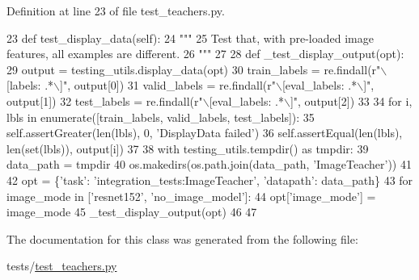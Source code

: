 Definition at line 23 of file test\+\_\+teachers.\+py.


\begin{DoxyCode}
23     \textcolor{keyword}{def }test\_display\_data(self):
24         \textcolor{stringliteral}{"""}
25 \textcolor{stringliteral}{        Test that, with pre-loaded image features, all examples are different.}
26 \textcolor{stringliteral}{        """}
27 
28         \textcolor{keyword}{def }\_test\_display\_output(opt):
29             output = testing\_utils.display\_data(opt)
30             train\_labels = re.findall(\textcolor{stringliteral}{r"\(\backslash\)[labels: .*\(\backslash\)]"}, output[0])
31             valid\_labels = re.findall(\textcolor{stringliteral}{r"\(\backslash\)[eval\_labels: .*\(\backslash\)]"}, output[1])
32             test\_labels = re.findall(\textcolor{stringliteral}{r"\(\backslash\)[eval\_labels: .*\(\backslash\)]"}, output[2])
33 
34             \textcolor{keywordflow}{for} i, lbls \textcolor{keywordflow}{in} enumerate([train\_labels, valid\_labels, test\_labels]):
35                 self.assertGreater(len(lbls), 0, \textcolor{stringliteral}{'DisplayData failed'})
36                 self.assertEqual(len(lbls), len(set(lbls)), output[i])
37 
38         with testing\_utils.tempdir() \textcolor{keyword}{as} tmpdir:
39             data\_path = tmpdir
40             os.makedirs(os.path.join(data\_path, \textcolor{stringliteral}{'ImageTeacher'}))
41 
42             opt = \{\textcolor{stringliteral}{'task'}: \textcolor{stringliteral}{'integration\_tests:ImageTeacher'}, \textcolor{stringliteral}{'datapath'}: data\_path\}
43             \textcolor{keywordflow}{for} image\_mode \textcolor{keywordflow}{in} [\textcolor{stringliteral}{'resnet152'}, \textcolor{stringliteral}{'no\_image\_model'}]:
44                 opt[\textcolor{stringliteral}{'image\_mode'}] = image\_mode
45                 \_test\_display\_output(opt)
46 
47 
\end{DoxyCode}


The documentation for this class was generated from the following file\+:\begin{DoxyCompactItemize}
\item 
tests/\hyperlink{test__teachers_8py}{test\+\_\+teachers.\+py}\end{DoxyCompactItemize}
